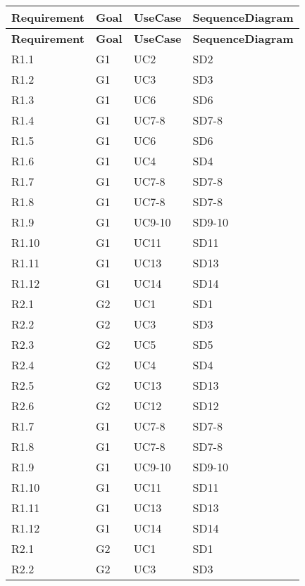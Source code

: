     \begin{longtable}{|p{}|p{}|p{}|p{}|} %
    \hline
    \textbf{Requirement} & \textbf{Goal} & \textbf{UseCase} & \textbf{SequenceDiagram} \\
    \hline
    \endfirsthead %
    \hline
    \textbf{Requirement} & \textbf{Goal} & \textbf{UseCase} & \textbf{SequenceDiagram} \\
    \hline
    \endhead
    
    \hline
    \endfoot
    
    \hline
    \endlastfoot
    
    R1.1 & G1 & UC2    & SD2  \\
    R1.2 & G1 & UC3    & SD3  \\
    R1.3 & G1 & UC6    & SD6  \\
    R1.4 & G1 & UC7-8  & SD7-8 \\
    R1.5 & G1 & UC6    & SD6  \\
    R1.6 & G1 & UC4    & SD4  \\
    R1.7 & G1 & UC7-8  & SD7-8 \\
    R1.8 & G1 & UC7-8  & SD7-8 \\
    R1.9 & G1 & UC9-10 & SD9-10 \\
    R1.10 & G1 & UC11  & SD11 \\
    R1.11 & G1 & UC13  & SD13 \\
    R1.12 & G1 & UC14  & SD14 \\
    R2.1 & G2 & UC1    & SD1  \\
    R2.2 & G2 & UC3    & SD3  \\
    R2.3 & G2 & UC5    & SD5  \\
    R2.4 & G2 & UC4    & SD4  \\
    R2.5 & G2 & UC13   & SD13 \\
    R2.6 & G2 & UC12   & SD12 \\
    R1.7 & G1 & UC7-8  & SD7-8 \\
    R1.8 & G1 & UC7-8  & SD7-8 \\
    R1.9 & G1 & UC9-10 & SD9-10 \\
    R1.10 & G1 & UC11  & SD11 \\
    R1.11 & G1 & UC13  & SD13 \\
    R1.12 & G1 & UC14  & SD14 \\
    R2.1 & G2 & UC1    & SD1  \\
    R2.2 & G2 & UC3    & SD3  \\

\end{longtable}
